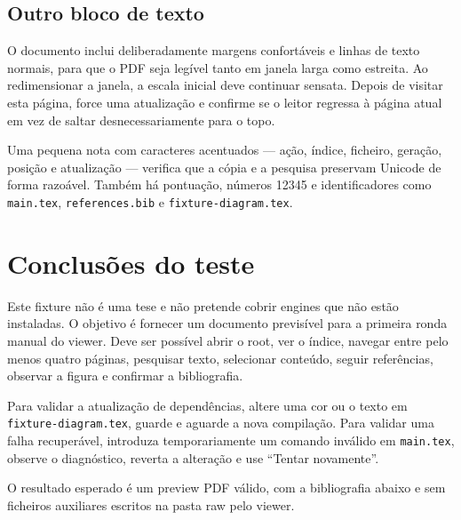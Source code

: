 \documentclass[11pt,a4paper]{article}
\begin{document}
\subsection{Outro bloco de texto}
\label{subsec:mais-texto}
O documento inclui deliberadamente margens confortáveis e linhas de texto
normais, para que o PDF seja legível tanto em janela larga como estreita. Ao
redimensionar a janela, a escala inicial deve continuar sensata. Depois de
visitar esta página, force uma atualização e confirme se o leitor regressa à
página atual em vez de saltar desnecessariamente para o topo.

Uma pequena nota com caracteres acentuados — ação, índice, ficheiro, geração,
posição e atualização — verifica que a cópia e a pesquisa preservam Unicode de
forma razoável. Também há pontuação, números 12345 e identificadores como
\texttt{main.tex}, \texttt{references.bib} e \texttt{fixture-diagram.tex}.

\newpage
\section{Conclusões do teste}
\label{sec:conclusoes}

Este fixture não é uma tese e não pretende cobrir engines que não estão
instaladas. O objetivo é fornecer um documento previsível para a primeira
ronda manual do viewer. Deve ser possível abrir o root, ver o índice,
navegar entre pelo menos quatro páginas, pesquisar texto, selecionar conteúdo,
seguir referências, observar a figura e confirmar a bibliografia.

Para validar a atualização de dependências, altere uma cor ou o texto em
\texttt{fixture-diagram.tex}, guarde e aguarde a nova compilação. Para validar
uma falha recuperável, introduza temporariamente um comando inválido em
\texttt{main.tex}, observe o diagnóstico, reverta a alteração e use
``Tentar novamente''.

O resultado esperado é um preview PDF válido, com a bibliografia abaixo e sem
ficheiros auxiliares escritos na pasta raw pelo viewer.

\clearpage
{}


\end{document}
